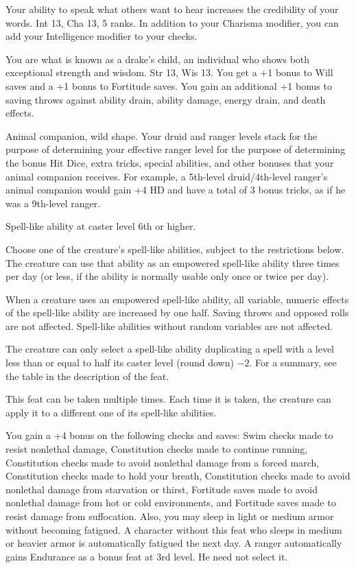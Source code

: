 {Your ability to speak what others want to hear increases the credibility of your words.}
{Int 13, Cha 13,  5 ranks.}
{In addition to your Charisma modifier, you can add your Intelligence modifier to your  checks.}
{}{}

{You are what is known as a drake's child, an individual who shows both exceptional strength and wisdom.}
{Str 13, Wis 13.}
{You get a +1 bonus to Will saves and a +1 bonus to Fortitude saves. You gain an additional +1 bonus to saving throws against ability drain, ability damage, energy drain, and death effects.}
{}{}

{Animal companion, wild shape.}
{
Your druid and ranger levels stack for the purpose of determining your effective ranger level for the purpose of determining the bonus Hit Dice, extra tricks, special abilities, and other bonuses that your animal companion receives. For example, a 5th-level druid/4th-level ranger's animal companion would gain +4 HD and have a total of 3 bonus tricks, as if he was a 9th-level ranger.
}

{}
{Spell-like ability at caster level 6th or higher.}
{Choose one of the creature's spell-like abilities, subject to the restrictions below. The creature can use that ability as an empowered spell-like ability three times per day (or less, if the ability is normally usable only once or twice per day).

When a creature uses an empowered spell-like ability, all variable, numeric effects of the spell-like ability are increased by one half. Saving throws and opposed rolls are not affected. Spell-like abilities without random variables are not affected.

The creature can only select a spell-like ability duplicating a spell with a level less than or equal to half its caster level (round down) $-2$. For a summary, see the table in the description of the  feat.}
{}
{This feat can be taken multiple times. Each time it is taken, the creature can apply it to a different one of its spell-like abilities.}

{}
{You gain a +4 bonus on the following checks and saves: Swim checks made to resist nonlethal damage, Constitution checks made to continue running, Constitution checks made to avoid nonlethal damage from a forced march, Constitution checks made to hold your breath, Constitution checks made to avoid nonlethal damage from starvation or thirst, Fortitude saves made to avoid nonlethal damage from hot or cold environments, and Fortitude saves made to resist damage from suffocation. Also, you may sleep in light or medium armor without becoming fatigued.}
{A character without this feat who sleeps in medium or heavier armor is automatically fatigued the next day.}{}
{A ranger automatically gains Endurance as a bonus feat at 3rd level. He need not select it.}


